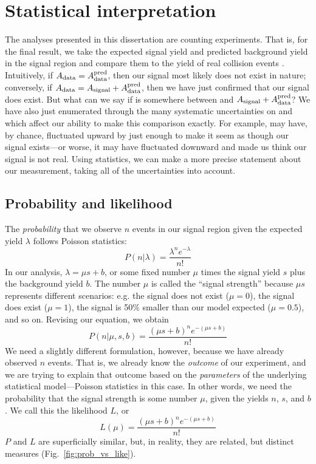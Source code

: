 \section{Statistical interpretation} %
The analyses presented in this dissertation are counting experiments. 
That is, for the final result, we take the expected signal yield \Asignal and predicted background yield \AdataPred in the signal region and compare them to the yield of real collision events \Adata. 
Intuitively, if $A_{\text{data}} = A_{\text{data}}^{\text{pred}}$, then our signal most likely does not exist in nature; conversely, if $A_{\text{data}} = A_{\text{signal}}+A_{\text{data}}^{\text{pred}}$, then we have just confirmed that our signal does exist. 
But what can we say if \Adata is somewhere between \AdataPred and $A_{\text{signal}}+A_{\text{data}}^{\text{pred}}$? 
We have also just enumerated through the many systematic uncertainties on \Asignal and \AdataPred which affect our ability to make this comparison exactly. 
For example, \AdataPred may have, by chance, fluctuated upward by just enough to make it seem as though our signal exists---or worse, it may have fluctuated downward and made us think our signal is not real. 
Using statistics, we can make a more precise statement about our measurement, taking all of the uncertainties into account. 

\subsection{Probability and likelihood}
The \textit{probability} that we observe $n$ events in our signal region given the expected yield $\lambda$ follows Poisson statistics:
\begin{equation}
    P(n|\lambda) = \frac{\lambda^n e^{-\lambda}}{n!}
\end{equation}
In our analysis, $\lambda = \mu s + b$, or some fixed number $\mu$ times the signal yield $s$ plus the background yield $b$. 
The number $\mu$ is called the ``signal strength'' because $\mu s$ represents different scenarios: e.g. the signal does not exist ($\mu = 0$), the signal does exist ($\mu = 1$), the signal is 50\% smaller than our model expected ($\mu = 0.5$), and so on. 
Revising our equation, we obtain
\begin{equation}
    P(n|\mu, s, b) = \frac{(\mu s + b)^n e^{-(\mu s + b)}}{n!}
\end{equation}
We need a slightly different formulation, however, because we have already observed $n$ events. 
That is, we already know the \textit{outcome} of our experiment, and we are trying to explain that outcome based on the \textit{parameters} of the underlying statistical model---Poisson statistics in this case. 
In other words, we need the probability that the signal strength is some number $\mu$, given the yields $n$, $s$, and $b$. 
We call this the likelihood $L$, or
\begin{equation}
    L(\mu) = \frac{(\mu s + b)^n e^{-(\mu s + b)}}{n!}
\end{equation}
$P$ and $L$ are superficially similar, but, in reality, they are related, but distinct measures (Fig.~\ref{fig:prob_vs_like}). 

